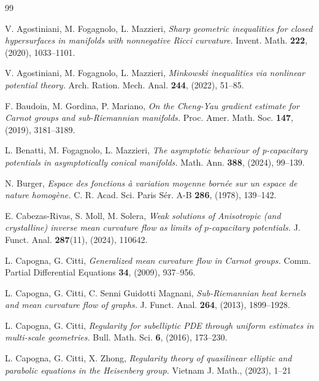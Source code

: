 \documentclass[10pt]{amsart}
\numberwithin{equation}{section}
\theoremstyle{definition}
\begin{document}
\begin{thebibliography}{99}




{\sc V. Agostiniani, M. Fogagnolo, L. Mazzieri},
{\em  Sharp geometric inequalities for closed hypersurfaces in manifolds with nonnegative Ricci curvature.}
Invent. Math. {\bf 222}, (2020),  1033--1101.

{\sc V. Agostiniani, M. Fogagnolo, L. Mazzieri},
{\em Minkowski inequalities via nonlinear potential theory.} 
Arch. Ration. Mech. Anal. {\bf 244}, (2022), 51--85.


{\sc F. Baudoin, M. Gordina, P. Mariano},
{\em On the Cheng-Yau gradient estimate for Carnot groups and sub-Riemannian manifolds.}
Proc. Amer. Math. Soc. {\bf 147}, (2019), 3181--3189.

{\sc  L. Benatti, M. Fogagnolo, L. Mazzieri},
{\em The asymptotic behaviour of p-capacitary potentials in asymptotically conical manifolds.}
Math. Ann. {\bf 388}, (2024), 99--139.

{\sc N. Burger},
{\em Espace des fonctions \`a variation moyenne born\'{e}e sur un espace de nature homog\`ene.}
C. R. Acad. Sci. Paris S\'er. A-B {\bf 286}, (1978), 139--142. 

{\sc E. Cabezas-Rivas, S. Moll, M. Solera}, 
{\em Weak solutions of Anisotropic (and crystalline) inverse mean curvature flow as limits of $p$-capacitary potentials.}
J. Funct. Anal. {\bf 287}(11), (2024), 110642.

{\sc L. Capogna, G. Citti},
{\em Generalized mean curvature flow in Carnot groups.} 
Comm. Partial Differential Equations {\bf 34}, (2009), 937--956.

{\sc L. Capogna, G. Citti, C. Senni Guidotti Magnani},
{\em Sub-Riemannian heat kernels and mean curvature flow of graphs.}
J. Funct. Anal. {\bf 264}, (2013), 1899--1928. 

{\sc L. Capogna, G. Citti},
{\em Regularity for subelliptic PDE through uniform estimates in multi-scale geometries.} 
Bull. Math. Sci. {\bf 6}, (2016), 173--230.

{\sc L. Capogna, G. Citti, X. Zhong},
{\em Regularity theory of quasilinear elliptic and parabolic equations in the Heisenberg group.}
 Vietnam J. Math., (2023), 1--21


\end{thebibliography}
\end{document}
